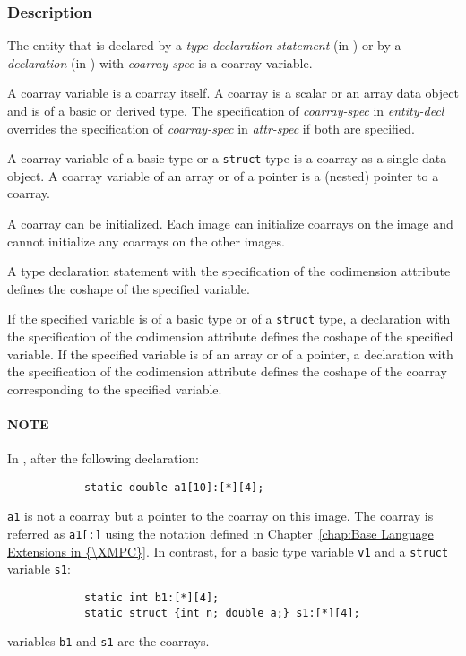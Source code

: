 \subsubsection*{Description}

The entity that is declared
by a {\it type-declaration-statement} (in {\XMPF}) or 
by a {\it declaration} (in {\XMPC})
with {\it coarray-spec} is a coarray variable.

{\onlyF} A coarray variable is a coarray itself.
A coarray is a scalar or an array data object and is of a basic or derived type.
The specification of {\it coarray-spec} in {\it entity-decl} 
overrides the specification of {\it coarray-spec} in {\it attr-spec}
if both are specified.

{\onlyC} 
A coarray variable of a basic type or a {\tt struct} type is a coarray 
as a single data object.
A coarray variable of an array or of a pointer is a (nested) pointer 
to a coarray.

A coarray can be initialized. 
Each image can initialize coarrays on the image and cannot initialize
any coarrays on the other images.


{\onlyF} A type declaration statement 
with the specification of the codimension attribute
defines the coshape of the specified variable.

{\onlyC} If the specified variable is of a basic type or of a {\tt struct} type,
a declaration with the specification of the codimension attribute
defines the coshape of the specified variable.
If the specified variable is of an array or of a pointer,
a declaration with the specification of the codimension attribute
defines the coshape of the coarray corresponding to the specified variable.


\paragraph*{NOTE}
In {\XMPC}, after the following declaration:
\begin{verbatim}
            static double a1[10]:[*][4];
\end{verbatim}
{\tt a1} is not a coarray but a pointer to the coarray on this image.
The coarray is referred as {\tt a1[:]} using the notation defined in 
Chapter~\ref{chap:Base Language Extensions in {\XMPC}}.
In contrast, for a basic type variable {\tt v1} and a {\tt struct} 
variable {\tt s1}:
\begin{verbatim}
            static int b1:[*][4];
            static struct {int n; double a;} s1:[*][4];
\end{verbatim}
variables {\tt b1} and {\tt s1} are the coarrays.



